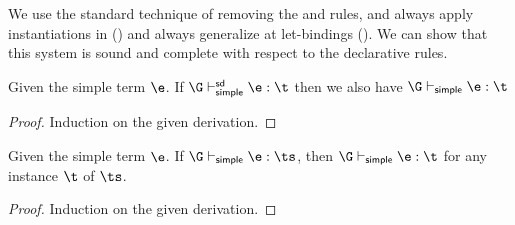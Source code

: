 \documentclass[acmsmall,screen,nonacm%
\Anonymous{,anonymous}{}%
\Final{}{,review}%
]{acmart}
\begin{document}
We use the standard technique of removing the  and  rules,
and always apply instantiations in  () and always
generalize at let-bindings (). We can show that this system is
sound and complete with respect to the declarative rules.

\begin{theorem}
  \label{thm:soundness-sd}
  Given the simple term $\e$.
  If $\G \thsimplesd \e : \t$ then we also have $\G \thsimple \e : \t$
  \begin{proof}
    Induction on the given derivation.
  \end{proof}
\end{theorem}

\begin{theorem}
  \label{thm:completeness-sd}
  Given the simple term $\e$.
  If $\G \thsimple \e : \ts$, then $\G \thsimple \e : \t$ for any instance $\t$ of $\ts$.
  \begin{proof}
    Induction on the given derivation.
  \end{proof}
\end{theorem}
\end{document}
